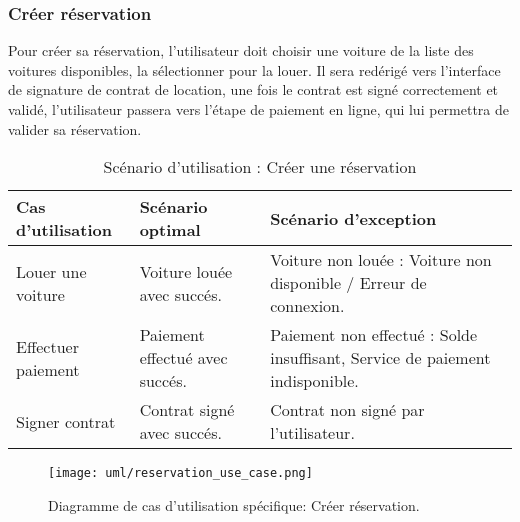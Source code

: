 \subsubsection{Créer réservation}
Pour créer sa réservation, l'utilisateur doit choisir une voiture de la liste des voitures disponibles, la sélectionner pour la louer. Il sera redérigé vers l'interface de signature de contrat de location, une fois le contrat est signé correctement et validé, l'utilisateur passera vers l'étape de paiement en ligne, qui lui permettra de valider sa réservation.
\begin{table}[H]
    \begin{center}
        \begin{tabularx}{\textwidth} {
                | >{\centering\arraybackslash}X
                | >{\centering\arraybackslash}X
                | >{\centering\arraybackslash}X |}
            \hline
            Cas d'utilisation  & Scénario optimal               & Scénario d'exception                                                         \\
            \hline
            Louer une voiture  & Voiture louée avec succés.     & Voiture non louée : Voiture non disponible / Erreur de connexion.            \\
            \hline
            Effectuer paiement & Paiement effectué avec succés. & Paiement non effectué : Solde insuffisant, Service de paiement indisponible. \\
            \hline
            Signer contrat     & Contrat signé avec succés.     & Contrat non signé par l'utilisateur.                                         \\
            \hline
        \end{tabularx}
        \captionsetup{justification=centering}
        \caption{Scénario d'utilisation : Créer une réservation}
        \label{tab:reservation_scenario}
    \end{center}
\end{table}
\begin{figure}[H]
    \centering
    \texttt{[image: uml/reservation\_use\_case.png]}
    \vspace{1cm}
    \captionsetup{justification=centering}
    \caption{Diagramme de cas d'utilisation spécifique: Créer réservation.}
    \label{fig:use_case_create_res}
\end{figure}
